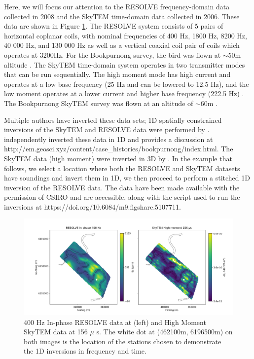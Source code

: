 Here, we will focus our attention to the RESOLVE frequency-domain data
collected in 2008 and the SkyTEM time-domain data collected in 2006. These data are shown in
Figure \ref{fig:booky_data}. The RESOLVE system consists of 5 pairs of
horizontal coplanar coils, with nominal frequencies of 400 Hz, 1800 Hz, 8200
Hz, 40 000 Hz, and 130 000 Hz as well as a vertical coaxial coil pair of coils which
operates at 3200Hz. For the Bookpurnong survey, the bird was flown at $\sim$50m altitude
\citep{Viezzoli2010}. The SkyTEM time-domain system operates in two
transmitter modes that can be run sequentially. The high moment mode has high
current and operates at a low base frequency (25 Hz and can be lowered to 12.5
Hz), and the low moment operates at a lower current and higher base frequency
(222.5 Hz) \citep{Sorensen2004}. The Bookpurnong SkyTEM survey was flown at an
altitude of $\sim$60m \citep{Viezzoli2010}.

Multiple authors have inverted these data sets; 1D spatially constrained
inversions of the SkyTEM and RESOLVE data were performed by
\citep{Viezzoli2009, Viezzoli2010}. \cite{Yang2017} independently inverted
these data in 1D and provides a discussion at
http://em.geosci.xyz/content/case\_histories/bookpurnong/index.html. The
SkyTEM data (high moment) were inverted in 3D by \citep{Wilson2010}. In the
example that follows, we select a location where both the RESOLVE and SkyTEM
datasets have soundings and invert them in 1D, we then proceed to perform a stitched 1D
inversion of the RESOLVE data. The data have been made available with the
permission of CSIRO and are accessible, along with the script used to run the
inversions at https://doi.org/10.6084/m9.figshare.5107711.

{%
\begin{figure}[htb!]
    \centering
    \includegraphics[width=\textwidth]{images/resolve_skytem_data.png}
\caption{
    400 Hz In-phase RESOLVE data at (left) and High Moment SkyTEM data at 156
    $\mu$ s. The white dot at (462100m, 6196500m) on both images is the
    location of the stations chosen to demonstrate the 1D inversions in
    frequency and time.
}
\label{fig:booky_data}
\end{figure}
}



